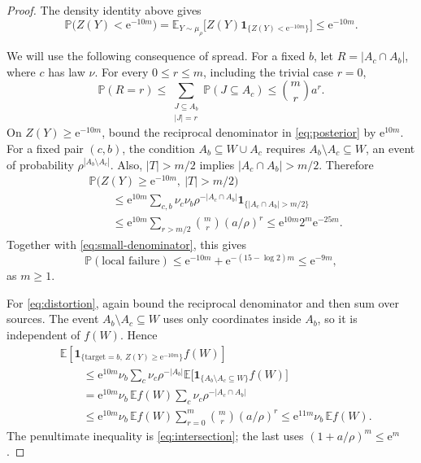 \documentclass[11pt]{article}
\numberwithin{equation}{section}
\newcommand{\PP}{\mathbb P}
\newcommand{\EE}{\mathbb E}
\newcommand{\ind}{\mathbf 1}
\newcommand{\ee}{\mathrm e}
\begin{document}
\begin{proof}
The density identity above gives
\begin{equation}\label{eq:small-denominator}
 \PP\bigl(Z(Y)<\ee^{-10m}\bigr)
 =\EE_{Y\sim\mu_\rho}
   \bigl[Z(Y)\ind_{\{Z(Y)<\ee^{-10m}\}}\bigr]
 \le\ee^{-10m}.
\end{equation}

We will use the following consequence of spread. For a fixed $b$,
let $R=|A_c\cap A_b|$, where $c$ has law $\nu$. For every
$0\le r\le m$, including the trivial case $r=0$,
\begin{equation}\label{eq:intersection}
 \PP(R=r)
 \le\sum_{\substack{J\subseteq A_b\\|J|=r}}
        \PP(J\subseteq A_c)
 \le\binom mr a^r.
\end{equation}
On $Z(Y)\ge\ee^{-10m}$, bound the reciprocal denominator in
\eqref{eq:posterior} by $\ee^{10m}$. For a fixed pair $(c,b)$,
the condition $A_b\subseteq W\cup A_c$ requires
$A_b\setminus A_c\subseteq W$, an event of probability
$\rho^{|A_b\setminus A_c|}$. Also, $|T|>m/2$ implies
$|A_c\cap A_b|>m/2$. Therefore
\begin{align*}
 &\PP\bigl(Z(Y)\ge\ee^{-10m},\ |T|>m/2\bigr)\\
 &\qquad\le
 \ee^{10m}\sum_{c,b}\nu_c\nu_b
 \rho^{-|A_c\cap A_b|}
 \ind_{\{|A_c\cap A_b|>m/2\}}\\
 &\qquad\le
 \ee^{10m}\sum_{r>m/2}\binom mr(a/\rho)^r
 \le \ee^{10m}2^m\ee^{-25m}.
\end{align*}
Together with \eqref{eq:small-denominator}, this gives
\[
 \PP(\text{local failure})
 \le\ee^{-10m}+\ee^{-(15-\log 2)m}
 \le\ee^{-9m},
\]
as $m\ge1$.

For \eqref{eq:distortion}, again bound the reciprocal denominator
and then sum over sources. The event
$A_b\setminus A_c\subseteq W$ uses only coordinates inside $A_b$,
so it is independent of $f(W)$. Hence
\begin{align*}
 &\EE\!\left[
 \ind_{\{\mathrm{target}=b,\ Z(Y)\ge\ee^{-10m}\}} f(W)
 \right]\\
 &\qquad\le
 \ee^{10m}\nu_b\sum_c\nu_c\rho^{-|A_b|}
       \EE\bigl[\ind_{\{A_b\setminus A_c\subseteq W\}}f(W)\bigr]\\
 &\qquad=
 \ee^{10m}\nu_b\,\EE f(W)
       \sum_c\nu_c\rho^{-|A_c\cap A_b|}\\
 &\qquad\le
 \ee^{10m}\nu_b\,\EE f(W)
       \sum_{r=0}^m\binom mr(a/\rho)^r
 \le\ee^{11m}\nu_b\,\EE f(W).
\end{align*}
The penultimate inequality is \eqref{eq:intersection}; the last uses
$(1+a/\rho)^m\le\ee^m$.
\end{proof}
\end{document}
